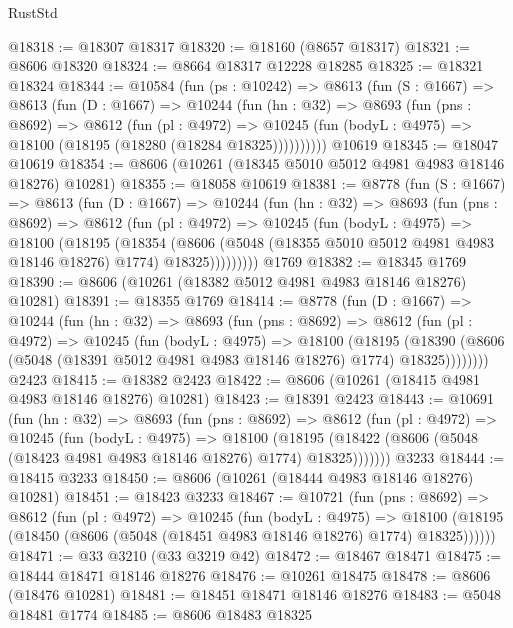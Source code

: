 \begin{lexlean}{RustStd}
\begin{coremodule}
@18318 := @18307 @18317
@18320 := @18160 (@8657 @18317)
@18321 := @8606 @18320
@18324 := @8664 @18317 @12228 @18285
@18325 := @18321 @18324
@18344 := @10584
    (fun (ps : @10242) =>
    @8613
      (fun (S : @1667) =>
      @8613
        (fun (D : @1667) =>
        @10244
          (fun (hn : @32) =>
          @8693
            (fun (pns : @8692) =>
            @8612
              (fun (pl : @4972) =>
              @10245 (fun (bodyL : @4975) => @18100 (@18195 (@18280 (@18284 @18325))))))))))
    @10619
@18345 := @18047 @10619
@18354 := @8606 (@10261 (@18345 @5010 @5012 @4981 @4983 @18146 @18276) @10281)
@18355 := @18058 @10619
@18381 := @8778
    (fun (S : @1667) =>
    @8613
      (fun (D : @1667) =>
      @10244
        (fun (hn : @32) =>
        @8693
          (fun (pns : @8692) =>
          @8612
            (fun (pl : @4972) =>
            @10245
              (fun (bodyL : @4975) =>
              @18100
                (@18195
                  (@18354
                    (@8606
                      (@5048 (@18355 @5010 @5012 @4981 @4983 @18146 @18276) @1774)
                      @18325)))))))))
    @1769
@18382 := @18345 @1769
@18390 := @8606 (@10261 (@18382 @5012 @4981 @4983 @18146 @18276) @10281)
@18391 := @18355 @1769
@18414 := @8778
    (fun (D : @1667) =>
    @10244
      (fun (hn : @32) =>
      @8693
        (fun (pns : @8692) =>
        @8612
          (fun (pl : @4972) =>
          @10245
            (fun (bodyL : @4975) =>
            @18100
              (@18195
                (@18390 (@8606 (@5048 (@18391 @5012 @4981 @4983 @18146 @18276) @1774) @18325))))))))
    @2423
@18415 := @18382 @2423
@18422 := @8606 (@10261 (@18415 @4981 @4983 @18146 @18276) @10281)
@18423 := @18391 @2423
@18443 := @10691
    (fun (hn : @32) =>
    @8693
      (fun (pns : @8692) =>
      @8612
        (fun (pl : @4972) =>
        @10245
          (fun (bodyL : @4975) =>
          @18100
            (@18195 (@18422 (@8606 (@5048 (@18423 @4981 @4983 @18146 @18276) @1774) @18325)))))))
    @3233
@18444 := @18415 @3233
@18450 := @8606 (@10261 (@18444 @4983 @18146 @18276) @10281)
@18451 := @18423 @3233
@18467 := @10721
    (fun (pns : @8692) =>
    @8612
      (fun (pl : @4972) =>
      @10245
        (fun (bodyL : @4975) =>
        @18100 (@18195 (@18450 (@8606 (@5048 (@18451 @4983 @18146 @18276) @1774) @18325))))))
@18471 := @33 @3210 (@33 @3219 @42)
@18472 := @18467 @18471
@18475 := @18444 @18471 @18146 @18276
@18476 := @10261 @18475
@18478 := @8606 (@18476 @10281)
@18481 := @18451 @18471 @18146 @18276
@18483 := @5048 @18481 @1774
@18485 := @8606 @18483 @18325

\end{coremodule}
\end{lexlean}
